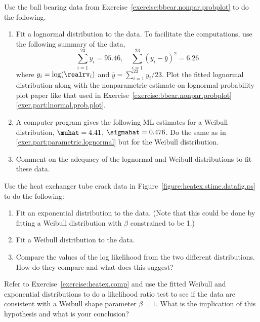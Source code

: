 \begin{exercise}
Use the ball bearing data from
Exercise~\ref{exercise:bbear.nonpar.probplot} to do the following.
\begin{enumerate}
\item
\label{exer.part:parametric.lognormal}
Fit a lognormal distribution to the data. To facilitate the
computations, use the following  summary of the 
data,
\begin{displaymath}
\sum_{i=1}^{23} y_{i}=95.46,
\quad
\sum_{i=1}^{23} \left (y_{i} -\bar{y}
	        \right )^{2}=6.26
\end{displaymath}
where $y_{i}=\log(\realrv_{i})$ and $\bar{y}=\sum_{i=1}^{23} y_{i}/23$.
Plot the fitted lognormal distribution along with the nonparametric estimate
on lognormal probability plot paper like that used in
Exercise~\ref{exercise:bbear.nonpar.probplot}\ref{exer.part:lnormal.prob.plot}.
\item
A computer program gives the following ML estimates for 
a Weibull distribution, $\muhat=4.41$, $\sigmahat=0.476$. 
Do the same as in 
\ref{exer.part:parametric.lognormal} but for the Weibull distribution.
\item
Comment on the adequacy of the lognormal and Weibull distributions
to fit these data. 
\end{enumerate}
\end{exercise}

\begin{exercise}
\label{exercise:heatex.comp}
Use the heat exchanger tube crack data in
Figure~\ref{figure:heatex.stime.datafig.ps} to do the following:
     \begin{enumerate}
\item
Fit an exponential distribution to the data.
(Note that this could be done 
by fitting a Weibull distribution with
$\beta$
constrained to be 1.)
\item
Fit a Weibull distribution to the  data.
\item
Compare the values of the log likelihood from the two different
distributions. How do they compare and what does this suggest?
\end{enumerate}
\end{exercise}
\begin{exercise}
Refer to Exercise~\ref{exercise:heatex.comp} and use the fitted
Weibull and exponential distributions to do a likelihood ratio test to
see if the data are consistent with a Weibull shape parameter
$\beta=1$.  What is the implication of this hypothesis and what is
your conclusion?
\end{exercise}

